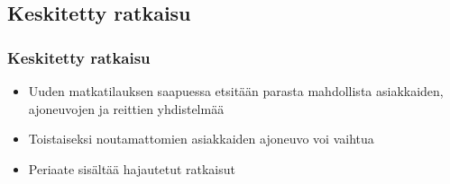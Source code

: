 \documentclass{beamer}
\begin{document}
\subsection{Keskitetty ratkaisu}
\begin{frame}
  \frametitle{Keskitetty ratkaisu}   %
\begin{itemize}
\item
Uuden matkatilauksen saapuessa etsitään parasta mahdollista asiakkaiden, ajoneuvojen ja reittien yhdistelmää
\item
Toistaiseksi noutamattomien asiakkaiden ajoneuvo voi vaihtua
\item
Periaate sisältää hajautetut ratkaisut
\end{itemize}
\end{frame}
\end{document}
